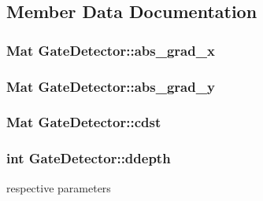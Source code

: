 \subsection{Member Data Documentation}
\subsubsection[{\texorpdfstring{abs\+\_\+grad\+\_\+x}{abs_grad_x}}]{\setlength{\rightskip}{0pt plus 5cm}Mat Gate\+Detector\+::abs\+\_\+grad\+\_\+x}\hypertarget{classGateDetector_a43f0a1989a295d2425f4a827cf566895}{}\label{classGateDetector_a43f0a1989a295d2425f4a827cf566895}
\subsubsection[{\texorpdfstring{abs\+\_\+grad\+\_\+y}{abs_grad_y}}]{\setlength{\rightskip}{0pt plus 5cm}Mat Gate\+Detector\+::abs\+\_\+grad\+\_\+y}\hypertarget{classGateDetector_a2ea407b651147e92ebf628ec23844634}{}\label{classGateDetector_a2ea407b651147e92ebf628ec23844634}
\subsubsection[{\texorpdfstring{cdst}{cdst}}]{\setlength{\rightskip}{0pt plus 5cm}Mat Gate\+Detector\+::cdst}\hypertarget{classGateDetector_af10ae6041a8ef84096ca56db35c41589}{}\label{classGateDetector_af10ae6041a8ef84096ca56db35c41589}
\subsubsection[{\texorpdfstring{ddepth}{ddepth}}]{\setlength{\rightskip}{0pt plus 5cm}int Gate\+Detector\+::ddepth}\hypertarget{classGateDetector_a2da9b04c7980d392ea0bcde4b33699ab}{}\label{classGateDetector_a2da9b04c7980d392ea0bcde4b33699ab}


respective parameters 

